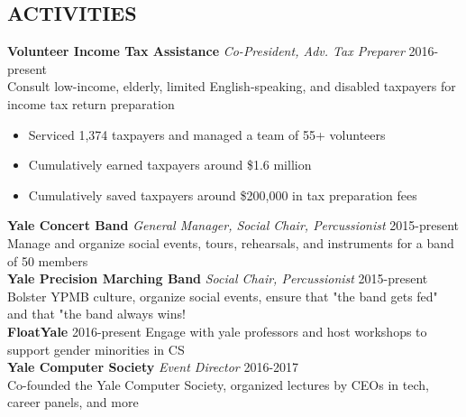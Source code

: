 \documentclass[margin, centered]{res}
\begin{document}
\begin{resume}
  \section{ACTIVITIES}
  \textbf{Volunteer Income Tax Assistance} \textit{Co-President, Adv. Tax Preparer} \hfill 2016-present \\
  Consult low-income, elderly, limited English-speaking, and disabled taxpayers for income tax return preparation
  \begin{itemize}
    \item Serviced 1,374 taxpayers and managed a team of 55+ volunteers
    \item Cumulatively earned taxpayers around \$1.6 million
    \item Cumulatively saved taxpayers around \$200,000 in tax preparation fees
    \end{itemize}
  \textbf{Yale Concert Band} \textit{General Manager, Social Chair, Percussionist} \hfill 2015-present
  Manage and organize social events, tours, rehearsals, and instruments for a band of 50 members \\ 
  \textbf{Yale Precision Marching Band} \textit{Social Chair, Percussionist} \hfill 2015-present
  Bolster YPMB culture, organize social events, ensure that "the band gets fed" and that "the band always wins! \\ 
  \textbf{FloatYale} \hfill 2016-present
  Engage with yale professors and host workshops to support gender minorities in CS \\ 
  \textbf{Yale Computer Society} \textit{Event Director} \hfill 2016-2017 \\
  Co-founded the Yale Computer Society, organized lectures by CEOs in tech, career panels, and more  

\end{resume}
\end{document}
